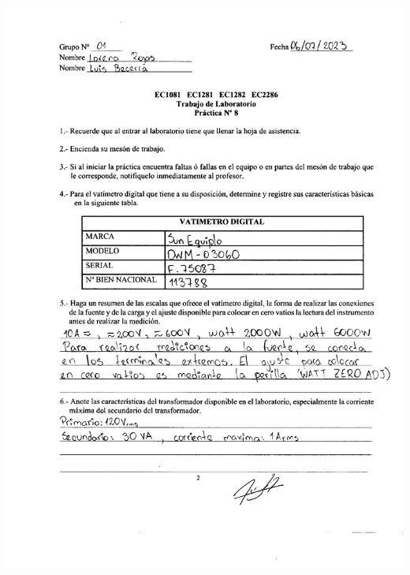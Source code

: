 \documentclass[12pt]{article}
\begin{document}
	\includegraphics[width=16cm,height=21cm]{Img/lab_8_0001}\\
\end{document}
